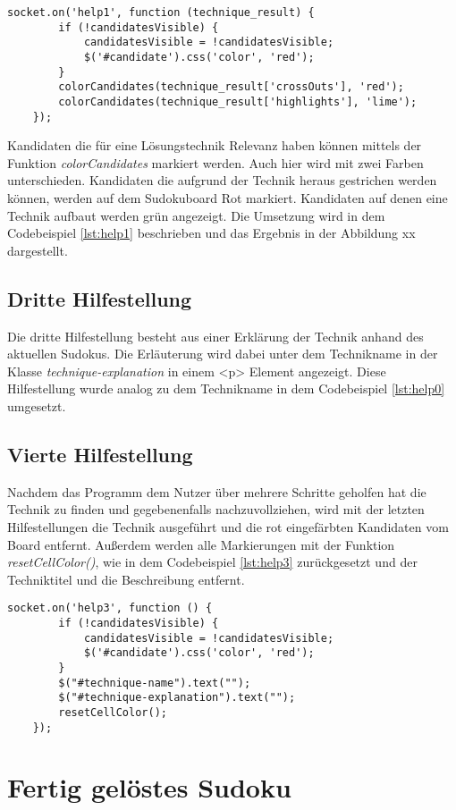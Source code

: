 \begin{lstlisting}[caption={Zweite Hilfestellung}, label={lst:help1}]
	socket.on('help1', function (technique_result) {
		if (!candidatesVisible) {
			candidatesVisible = !candidatesVisible;
			$('#candidate').css('color', 'red');
		}
		colorCandidates(technique_result['crossOuts'], 'red');
		colorCandidates(technique_result['highlights'], 'lime');
	});
\end{lstlisting}

Kandidaten die für eine Lösungstechnik Relevanz haben können mittels der Funktion \textit{colorCandidates} markiert werden. Auch hier wird mit zwei Farben unterschieden. Kandidaten die aufgrund der Technik heraus gestrichen werden können, werden auf dem Sudokuboard Rot markiert. Kandidaten auf denen eine Technik aufbaut werden grün angezeigt. Die Umsetzung wird in dem Codebeispiel \ref{lst:help1} beschrieben und das Ergebnis in der Abbildung xx dargestellt.


\subsection{Dritte Hilfestellung}
Die dritte Hilfestellung besteht aus einer Erklärung der Technik anhand des aktuellen Sudokus. Die Erläuterung wird dabei unter dem Technikname in der Klasse \textit{technique-explanation} in einem <p> Element angezeigt. Diese Hilfestellung wurde analog zu dem Technikname in dem Codebeispiel \ref{lst:help0} umgesetzt.

\subsection{Vierte Hilfestellung}
Nachdem das Programm dem Nutzer über mehrere Schritte geholfen hat die Technik zu finden und gegebenenfalls nachzuvollziehen, wird mit der letzten Hilfestellungen die Technik ausgeführt und die rot eingefärbten Kandidaten vom Board entfernt. Außerdem werden alle Markierungen mit der Funktion \textit{resetCellColor()}, wie in dem Codebeispiel \ref{lst:help3} zurückgesetzt und der Techniktitel und die Beschreibung entfernt. 

\begin{lstlisting}[caption={Vierte Hilfestellung}, label={lst:help3}]
	socket.on('help3', function () {
		if (!candidatesVisible) {
			candidatesVisible = !candidatesVisible;
			$('#candidate').css('color', 'red');
		}
		$("#technique-name").text("");
		$("#technique-explanation").text("");
		resetCellColor();
	});
\end{lstlisting}

\section{Fertig gelöstes Sudoku}
